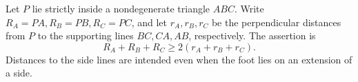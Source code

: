 Let \(P\) lie strictly inside a nondegenerate triangle \(ABC\).
Write \(R_A=PA,R_B=PB,R_C=PC\), and let \(r_A,r_B,r_C\)
be the perpendicular distances from \(P\) to the supporting
lines \(BC,CA,AB\), respectively. The assertion is
\[
 R_A+R_B+R_C\geq2(r_A+r_B+r_C).
\]
Distances to the side lines are intended even when the foot
lies on an extension of a side.
